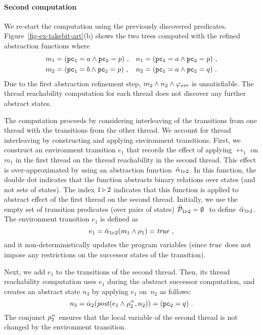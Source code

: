 \paragraph{Second \aret computation}
We re-start the \aret computation using the previously discovered 
predicates. 
Figure~\ref{fig-ex-takebit-art}(b) shows the two trees computed with
the refined abstraction functions where
%
\begin{equation*}
  \begin{array}[t]{l@{\;=\;}ll@{\;=\;}l}
    m_1 & (\pcone=a \land \pctwo=p)\ , & n_1 & (\pcone=a \land
    \pctwo=p)\ ,
    \\[\jot] 
    m_2 & (\pcone=b \land \pctwo=p)\ , & n_2 & (\pcone=a \land
    \pctwo=q)\ .
  \end{array}
\end{equation*}
%
Due to the first abstraction refinement step, $m_2 \land n_2 \land
\varphi_{\mathit{err}}$ is unsatisfiable.
The thread reachability computation for each thread does not discover
any further abstract states.

The \aret computation proceeds by considering interleaving of the
transitions from one thread with the transitions from the other
thread. 
We account for thread interleaving by constructing and applying
environment transitions.
First, we construct an environment transition $e_1$ that records the
effect of applying $\rel_1$ on $m_1$ in the first thread on the thread
reachability in the second thread.
This effect is over-approximated by using an abstraction
function~$\ddot{\alpha}_{1\triangleright 2}$.
In this function, the double dot indicates that the function abstracts
binary relations over states (and not sets of states).
The index $1\triangleright 2$ indicates that this function is applied
to abstract effect of the first thread on the second thread.
Initially, we use the empty set of transition predicates (over pairs
of states) $\ddot{\mathcal{P}}_{1\triangleright 2}=\emptyset\ $ to
define~$\ddot{\alpha}_{1\triangleright 2}$.
The environment transition $e_1$ is defined as
%
\begin{equation*}
  e_1 = \ddot{\alpha}_{1\triangleright 2}(m_1 \land \rho_1) = \mathit{true}\ ,
\end{equation*}
%
and it non-deterministically updates the program variables (since
$\mathit{true}$ does not impose any restrictions on the successor states of
the transition).

Next, we add $e_1$ to the transitions of the second thread.
Then, its thread reachability computation uses $e_1$ during the
abstract successor computation, and creates an abstract state $n_3$ by
applying $e_1$ on~$n_2$ as follows:
%
\begin{equation*}
  n_3 = \dot{\alpha}_{2}(\mathit{post}(e_1 \land \rho^=_{2}, n_2)) = (\mathtt{pc_2}
  = q)\ .
\end{equation*}
%
The conjunct $\rho^=_{2}$ ensures that the local variable of the
second thread is not changed by the environment transition.

